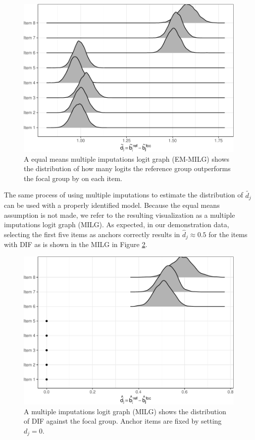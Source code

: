 \documentclass[
  11pt,
]{article}
\begin{document}
\begin{figure}[H]

{\centering \includegraphics[width=0.7\linewidth]{paper_files/figure-latex/emmilg-1} 

}

\caption{A equal means multiple imputations logit graph (EM-MILG) shows the distribution of how many logits the reference group outperforms the focal group by on each item.}\label{fig:emmilg}
\end{figure}

The same process of using multiple imputations to estimate the distribution of \(\tilde{d_j}\) can be used with a properly identified model. Because the equal means assumption is not made, we refer to the resulting visualization as a multiple imputations logit graph (MILG). As expected, in our demonstration data, selecting the first five items as anchors correctly results in \(\hat d_j \approx 0.5\) for the items with DIF as is shown in the MILG in Figure \ref{fig:milg}.

\begin{figure}[H]

{\centering \includegraphics[width=0.7\linewidth]{paper_files/figure-latex/milg-1} 

}

\caption{A multiple imputations logit graph (MILG) shows the distribution of DIF against the focal group. Anchor items are fixed by setting $d_j = 0$.}\label{fig:milg}
\end{figure}
\end{document}
